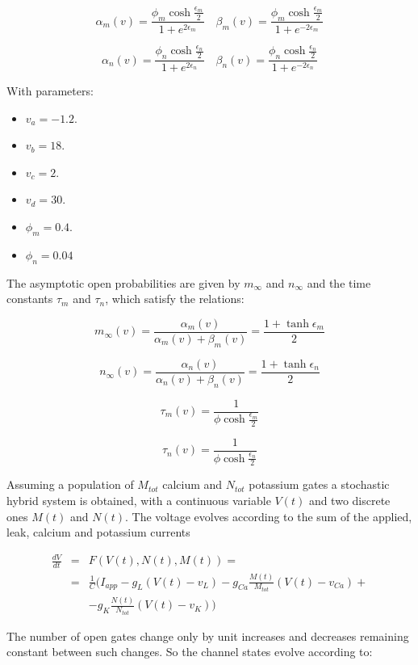 	$$\alpha_m(v) = \frac{\phi_m\cosh\frac{\epsilon_m}{2}}{1+e^{2\epsilon_m}}\quad\beta_m(v) = \frac{\phi_m\cosh\frac{\epsilon_m}{2}}{1+e^{-2\epsilon_m}}$$

	$$\alpha_n(v) = \frac{\phi_n\cosh\frac{\epsilon_n}{2}}{1+e^{2\epsilon_n}}\quad\beta_n(v) = \frac{\phi_n\cosh\frac{\epsilon_n}{2}}{1+e^{-2\epsilon_n}}$$

	With parameters:

	\begin{multicols}{3}
		\begin{itemize}
			\item $v_a = -1.2$.
			\item $v_b = 18$.
			\item $v_c = 2$.
			\item $v_d = 30$.
			\item $\phi_m = 0.4$.
			\item $\phi_n = 0.04$
		\end{itemize}
	\end{multicols}

	The asymptotic open probabilities are given by $m_\infty$ and $n_\infty$ and the time constants $\tau_m$ and $\tau_n$, which satisfy the relations:

	$$m_\infty(v) = \frac{\alpha_m(v)}{\alpha_m(v) + \beta_m(v)} = \frac{1+\tanh\epsilon_m}{2}$$

	$$n_\infty(v) = \frac{\alpha_n(v)}{\alpha_n(v) + \beta_n(v)} = \frac{1+\tanh\epsilon_n}{2}$$

	$$\tau_m(v) = \frac{1}{\phi\cosh\frac{\epsilon_m}{2}}$$

	$$\tau_n(v) = \frac{1}{\phi\cosh\frac{\epsilon_n}{2}}$$

	Assuming a population of $M_{tot}$ calcium and $N_{tot}$ potassium gates a stochastic hybrid system is obtained, with a continuous variable $V(t)$ and two discrete ones $M(t)$ and $N(t)$.
	The voltage evolves according to the sum of the applied, leak, calcium and potassium currents

	\begin{align*}
		\frac{dV}{dt} &=&  F(V(t), N(t), M(t)) = \\
									&=& \frac{1}{C}\biggl(I_{app} - g_L(V(t)-v_L)-g_{Ca}\frac{M(t)}{M_{tot}}(V(t)-v_{Ca}) +\\
									& &- g_K\frac{N(t)}{N_{tot}}(V(t)-v_K)\biggr)
	\end{align*}

	The number of open gates change only by unit increases and decreases remaining constant between such changes.
	So the channel states evolve according to:

